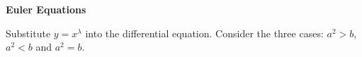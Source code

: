 {%
\begin{Hint}
  \label{hint y+5y+6y}
\end{Hint}









\begin{Hint}
  \label{hint y+sign y}
\end{Hint}










\begin{large}
  \noindent
  \textbf{Euler Equations}
\end{large}






\begin{Hint}
  \label{hint x2y+xy+y}
\end{Hint}




\begin{Hint}
  \label{hint x2y-2xy+2y}
\end{Hint}



\begin{Hint}
  \label{hint xy+y+1xy}
\end{Hint}





\begin{Hint}
  \label{hint x2y+2a1xy+by}
  Substitute $y = x^\lambda$ into the differential equation.  Consider the
  three cases: $a^2 > b$, $a^2 < b$ and $a^2 = b$.
\end{Hint}




\begin{Hint}
  \label{hint y1=eax}
\end{Hint}







}
